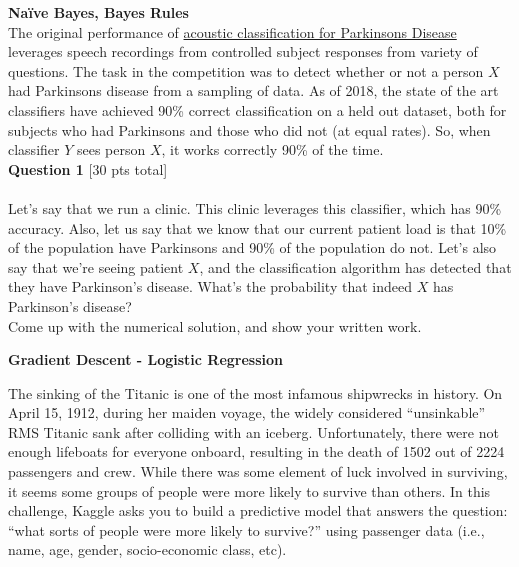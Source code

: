 \documentclass[paper=a4, fontsize=11pt]{scrartcl} %
\author{
    \textbf{YOUR NAME} \\ 
    \textbf{YOUR GIT USERNAME} \\ 
    \textbf{YOUR E-MAIL}
}%
\begin{document}
\maketitle %

{\huge \textbf{Na\"ive Bayes, Bayes Rules}} \\

The original performance of \href{https://www.ncbi.nlm.nih.gov/pmc/articles/PMC6339026/}{acoustic classification for Parkinsons Disease} leverages speech recordings from controlled subject responses from variety of questions. The task in the competition was to detect whether or not a person $X$ had Parkinsons disease from a sampling of data. As of 2018, the state of the art classifiers have achieved 90\% correct classification on a held out dataset, both for subjects who had Parkinsons and those who did not (at equal rates). So, when classifier $Y$ sees person $X$, it works correctly 90\% of the time. \\

{\Large \textbf{Question 1} [30 pts total]} \\
\\
Let's say that we run a clinic. This clinic leverages this classifier, which has 90\% accuracy. Also, let us say that we know that our current patient load is that 10\% of the population have Parkinsons and 90\% of the population do not. Let's also say that we're seeing patient $X$, and the classification algorithm has detected that they have Parkinson's disease. What's the probability that indeed $X$ has Parkinson's disease? \\

Come up with the numerical solution, and show your written work.

\vspace{1.5cm}
{\huge \textbf{Gradient Descent - Logistic Regression}}
\vspace{3mm}

The sinking of the Titanic is one of the most infamous shipwrecks in history. On April 15, 1912, during her maiden voyage, the widely considered “unsinkable” RMS Titanic sank after colliding with an iceberg. Unfortunately, there were not enough lifeboats for everyone onboard, resulting in the death of 1502 out of 2224 passengers and crew. While there was some element of luck involved in surviving, it seems some groups of people were more likely to survive than others. In this challenge, Kaggle asks you to build a predictive model that answers the question: “what sorts of people were more likely to survive?” using passenger data (i.e., name, age, gender, socio-economic class, etc). \\
\end{document}
